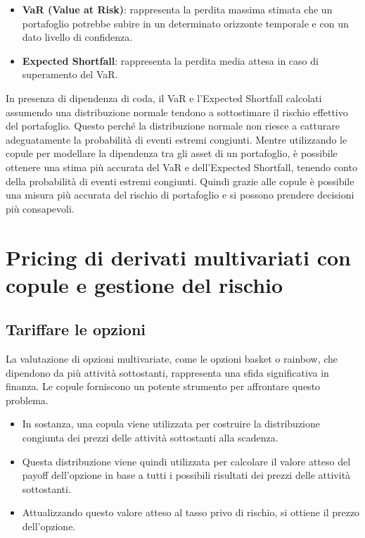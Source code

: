 \documentclass[%
	corpo=11pt,
    twoside,
    stile=classica,
    oldstyle,
    tipotesi=custom,
    greek,
    evenboxes,
]{toptesi}
\begin{document}
\begin{itemize}
	\item \textbf{VaR (Value at Risk)}: rappresenta la perdita massima stimata che un portafoglio potrebbe subire in un determinato orizzonte temporale e con un dato livello di confidenza.
	\item \textbf{Expected Shortfall}: rappresenta la perdita media attesa in caso di superamento del VaR.
\end{itemize}

In presenza di dipendenza di coda, il VaR e l’Expected Shortfall calcolati assumendo una distribuzione normale tendono a sottostimare il rischio effettivo del portafoglio. Questo perché la distribuzione normale non riesce a catturare adeguatamente la probabilità di eventi estremi congiunti. Mentre utilizzando le copule per modellare la dipendenza tra gli asset di un portafoglio, è possibile ottenere una stima più accurata del VaR e dell’Expected Shortfall, tenendo conto della probabilità di eventi estremi congiunti. Quindi grazie alle copule è possibile una misura più accurata del rischio di portafoglio e si possono prendere decisioni più consapevoli.
\newpage
\section{Pricing di derivati multivariati con copule e gestione del rischio}

\subsection{Tariffare le opzioni}
La valutazione di opzioni multivariate, come le opzioni basket o rainbow, che dipendono da più attività sottostanti, rappresenta una sfida significativa in finanza. Le copule forniscono un potente strumento per affrontare questo problema.

\begin{itemize}
	\item In sostanza, una copula viene utilizzata per costruire la distribuzione congiunta dei prezzi delle attività sottostanti alla scadenza.
	\item Questa distribuzione viene quindi utilizzata per calcolare il valore atteso del payoff dell’opzione in base a tutti i possibili risultati dei prezzi delle attività sottostanti.
	\item Attualizzando questo valore atteso al tasso privo di rischio, si ottiene il prezzo dell’opzione.
\end{itemize}
\end{document}
